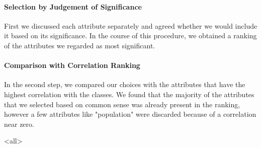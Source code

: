 \paragraph{Selection by Judgement of Significance}
First we discussed each attribute separately and agreed whether we
would include it based on its significance. In the course of this
procedure, we obtained a ranking of the attributes we regarded as most
significant.

\paragraph{Comparison with Correlation Ranking}
In the second step, we compared our choices with the attributes that
have the highest correlation with the classes. We found that the
majority of the attributes that we selected based on common sense was
already present in the ranking, however a few attributes like
"population" were discarded because of a correlation near zero.


\mode<all>
